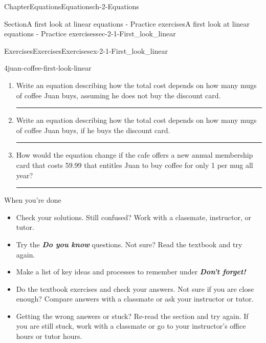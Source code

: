 \documentclass[twoside,11pt,]{book}
\newcommand{\alert}[1]{\textbf{\textit{#1}}}
\newlength{\workspacestrutwidth}
\numberwithin{equation}{section}
\newcommand{\amp}{&}
\begin{document}
\begin{chapterptx}{Chapter}{Equations}{}{Equations}{}{}{ch-2-Equations}
\begin{sectionptx}{Section}{A first look at linear equations - Practice exercises}{}{A first look at linear equations - Practice exercises}{}{}{sec-2-1-First_look_linear}
\begin{exercises-subsection-numberless}{Exercises}{Exercises}{}{Exercises}{}{}{ex-2-1-First_look_linear}
\begin{divisionexercise}{4}{}{}{juan-coffee-first-look-linear}
\begin{enumerate}[label=(\alph*),ref=\alph*]
%
%
\par\rule{\workspacestrutwidth}{0.75in}%
\item{}Write an equation describing how the total cost depends on how many mugs of coffee Juan buys, assuming he does not buy the discount card.%
\par\rule{\workspacestrutwidth}{1.5in}%
\item{}Write an equation describing how the total cost depends on how many mugs of coffee Juan buys, if he buys the discount card.%
\par\rule{\workspacestrutwidth}{1.5in}%
\item{}How would the equation change if the cafe offers a new annual membership card that costs \textdollar{}59.99 that entitles Juan to buy coffee for only \textdollar{}1 per mug all year?%
\par\rule{\workspacestrutwidth}{1in}%
\end{enumerate}%
\end{divisionexercise}%
\end{exercises-subsection-numberless}
\begin{conclusion}{When you're done \textellipsis{}}%
%
\begin{itemize}[label=\textbullet]
\item{}Check your solutions. Still confused? Work with a classmate, instructor, or tutor.%
\item{}Try the \alert{Do you know} questions. Not sure? Read the textbook and try again.%
\item{}Make a list of key ideas and processes to remember under \alert{Don't forget!}%
\item{}Do the textbook exercises and check your answers. Not sure if you are close enough? Compare answers with a classmate or ask your instructor or tutor.%
\item{}Getting the wrong answers or stuck? Re-read the section and try again. If you are still stuck, work with a classmate or go to your instructor's office hours or tutor hours.%

\end{itemize}
\end{conclusion}
\end{sectionptx}
\end{chapterptx}
\end{document}
